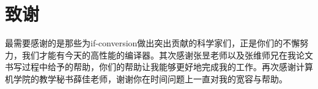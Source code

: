 \section{致谢}

最需要感谢的是那些为if-conversion做出突出贡献的科学家们，正是你们的不懈努力，我们才能有今天的高性能的编译器。其次感谢张昱老师以及张维师兄在我论文书写过程中给予的帮助，你们的帮助让我能够更好地完成我的工作。再次感谢计算机学院的教学秘书薛佳老师，谢谢你在时间问题上一直对我的宽容与帮助。